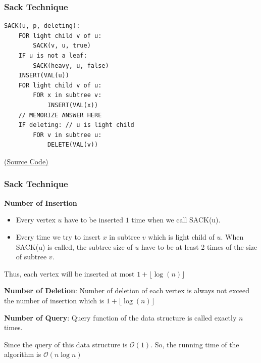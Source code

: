 \begin{frame}[fragile]
\frametitle{Sack Technique}  

\begin{small}
\begin{verbatim}
SACK(u, p, deleting):
    FOR light child v of u:
        SACK(v, u, true)
    IF u is not a leaf:
        SACK(heavy, u, false) 
    INSERT(VAL(u))
    FOR light child v of u:
        FOR x in subtree v:
            INSERT(VAL(x))
    // MEMORIZE ANSWER HERE
    IF deleting: // u is light child
        FOR v in subtree u:
            DELETE(VAL(v))
\end{verbatim}
\end{small}

\vfill

\href{https://gist.github.com/MasterIceZ/a3d830109208088d93a5a0f788014e18}{(Source Code)}
    
\end{frame}

\begin{frame}
\frametitle{Sack Technique}  

\textbf{Number of Insertion}

\begin{itemize}
    \item Every vertex $u$ have to be inserted $1$ time when we call SACK(u).
    
    \item Every time we try to insert $x$ in subtree $v$ which is light child of $u$. When SACK(u) is called, the subtree size of $u$ have to be at least 2 times of the size of subtree $v$.
\end{itemize}

Thus, each vertex will be inserted at most $1 + \lfloor \log(n) \rfloor$

\textbf{Number of Deletion}:
Number of deletion of each vertex is always not exceed the number of insertion which is $1 + \lfloor \log(n) \rfloor$

\textbf{Number of Query}:
Query function of the data structure is called exactly $n$ times.

Since the query of this data structure is $\mathcal{O}(1)$. So, the running time of the algorithm is $\mathcal{O}(n\log{n})$


\end{frame}